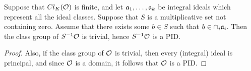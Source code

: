 \begin{proposition}
  Suppose that $Cl_{K}(\mathcal{O})$ is finite, and let $\mathfrak{a}_{1},\ldots,\mathfrak{a}_{k}$ be integral ideals which represent all the ideal classes.
  Suppose that $S$ is a multiplicative set not containing zero.
  Assume that there exists some $b \in S$ such that $b \in \cap_{i} \mathfrak{a}_{i}$.
  Then the class group of $S^{-1}\mathcal{O}$ is trivial, hence $S^{-1}\mathcal{O}$ is a PID.
\end{proposition}
\begin{proof}
  Also, if the class group of $\mathcal{O}$ is trivial, then every (integral) ideal is principal, and since $\mathcal{O}$ is a domain, it follows that $\mathcal{O}$ is a PID.
\end{proof}

